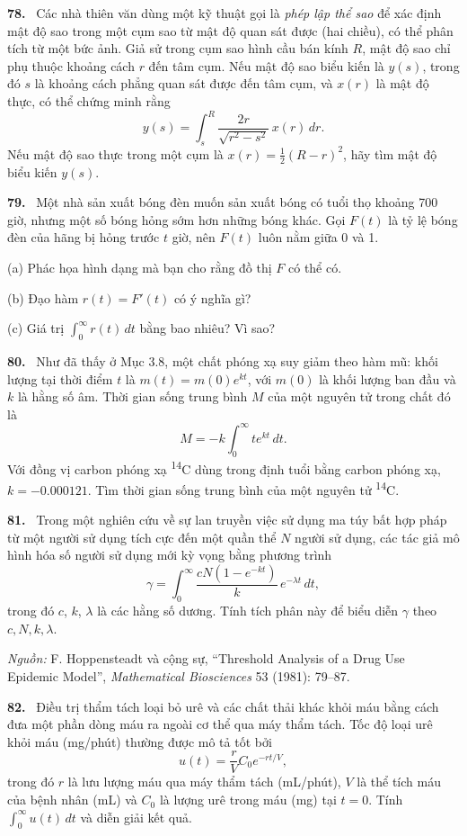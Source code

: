 \documentclass[12pt,a4paper]{article}
\newcommand{\bt}[1]{\par\smallskip\Needspace{5\baselineskip}\noindent\textbf{#1.}\ }
\begin{document}
\bt{78} Các nhà thiên văn dùng một kỹ thuật gọi là \textit{phép lập thể sao} để xác định mật độ sao trong một cụm sao từ mật độ quan sát được (hai chiều), có thể phân tích từ một bức ảnh. Giả sử trong cụm sao hình cầu bán kính $R$, mật độ sao chỉ phụ thuộc khoảng cách $r$ đến tâm cụm. Nếu mật độ sao biểu kiến là $y(s)$, trong đó $s$ là khoảng cách phẳng quan sát được đến tâm cụm, và $x(r)$ là mật độ thực, có thể chứng minh rằng
\[y(s)=\int_s^R\frac{2r}{\sqrt{r^2-s^2}}\,x(r)\,dr.\]
Nếu mật độ sao thực trong một cụm là $x(r)=\tfrac12(R-r)^2$, hãy tìm mật độ biểu kiến $y(s)$.

\bt{79} Một nhà sản xuất bóng đèn muốn sản xuất bóng có tuổi thọ khoảng 700 giờ, nhưng một số bóng hỏng sớm hơn những bóng khác. Gọi $F(t)$ là tỷ lệ bóng đèn của hãng bị hỏng trước $t$ giờ, nên $F(t)$ luôn nằm giữa 0 và 1.

(a) Phác họa hình dạng mà bạn cho rằng đồ thị $F$ có thể có.

(b) Đạo hàm $r(t)=F'(t)$ có ý nghĩa gì?

(c) Giá trị $\int_0^\infty r(t)\,dt$ bằng bao nhiêu? Vì sao?

\bt{80} Như đã thấy ở Mục 3.8, một chất phóng xạ suy giảm theo hàm mũ: khối lượng tại thời điểm $t$ là $m(t)=m(0)e^{kt}$, với $m(0)$ là khối lượng ban đầu và $k$ là hằng số âm. Thời gian sống trung bình $M$ của một nguyên tử trong chất đó là
\[M=-k\int_0^\infty te^{kt}\,dt.\]
Với đồng vị carbon phóng xạ \textsuperscript{14}C dùng trong định tuổi bằng carbon phóng xạ, $k=-0.000121$. Tìm thời gian sống trung bình của một nguyên tử \textsuperscript{14}C.

\bt{81} Trong một nghiên cứu về sự lan truyền việc sử dụng ma túy bất hợp pháp từ một người sử dụng tích cực đến một quần thể $N$ người sử dụng, các tác giả mô hình hóa số người sử dụng mới kỳ vọng bằng phương trình
\[\gamma=\int_0^\infty\frac{cN(1-e^{-kt})}{k}\,e^{-\lambda t}\,dt,\]
trong đó $c$, $k$, $\lambda$ là các hằng số dương. Tính tích phân này để biểu diễn $\gamma$ theo $c,N,k,\lambda$.

\textit{Nguồn:} F. Hoppensteadt và cộng sự, “Threshold Analysis of a Drug Use Epidemic Model”, \textit{Mathematical Biosciences} 53 (1981): 79–87.

\bt{82} Điều trị thẩm tách loại bỏ urê và các chất thải khác khỏi máu bằng cách đưa một phần dòng máu ra ngoài cơ thể qua máy thẩm tách. Tốc độ loại urê khỏi máu (mg/phút) thường được mô tả tốt bởi
\[u(t)=\frac rV C_0e^{-rt/V},\]
trong đó $r$ là lưu lượng máu qua máy thẩm tách (mL/phút), $V$ là thể tích máu của bệnh nhân (mL) và $C_0$ là lượng urê trong máu (mg) tại $t=0$. Tính $\int_0^\infty u(t)\,dt$ và diễn giải kết quả.
\end{document}
